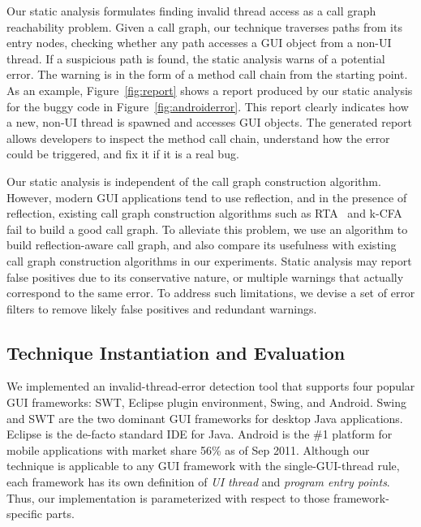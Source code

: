 Our static analysis formulates finding invalid thread access as a call graph reachability
problem. Given a call graph, our technique traverses
paths from its entry nodes, checking whether
any path accesses a GUI object from a non-UI thread. If 
a suspicious path is found, the static analysis warns of a potential error.
The warning is in the form of a method
call chain from the starting point.
As an example, Figure~\ref{fig:report} shows a report produced
by our static analysis for the buggy code in Figure~\ref{fig:androiderror}.
This report clearly indicates how a new, non-UI thread is spawned and
accesses GUI objects. The generated report allows  developers to
inspect the method call chain, understand how the error
could be triggered, and fix it if it is a real bug.

Our static analysis is independent of the call graph construction algorithm.
However, modern GUI applications tend to use reflection, and
in the presence of reflection, existing call graph construction algorithms such as RTA~\cite{rta}
and k-CFA~\cite{kcfa} fail to build a good call graph.
To alleviate this problem, we use an algorithm to build reflection-aware call graph, and
also compare its usefulness with existing call graph construction algorithms in
our experiments. Static analysis may report false positives due to its
conservative nature, or multiple warnings that actually correspond
to the same error. To address such limitations, we devise a set
 of error filters to remove likely false positives and redundant warnings.

\subsection{Technique Instantiation and Evaluation}


We implemented an invalid-thread-error detection tool that supports
four popular GUI frameworks: SWT, Eclipse plugin environment,
Swing, and Android. Swing and SWT are the
two dominant GUI frameworks for desktop Java applications.
Eclipse is the de-facto standard IDE for Java. Android is the \#1 platform for
mobile applications with market share 56\% as of Sep 2011.
Although our technique is applicable to any GUI
framework with the single-GUI-thread rule, each framework
has its own definition of \textit{UI thread} and \textit{program 
entry points}. Thus, our implementation is parameterized with respect to
those framework-specific parts.


